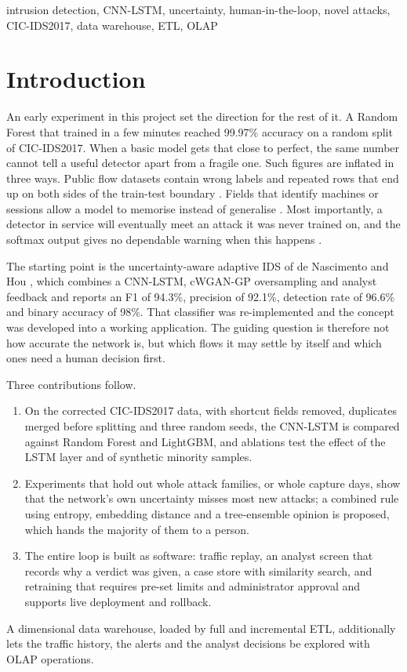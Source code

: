 \documentclass[conference]{IEEEtran}
\begin{document}
\begin{IEEEkeywords}
intrusion detection, CNN-LSTM, uncertainty, human-in-the-loop, novel attacks, CIC-IDS2017, data warehouse, ETL, OLAP
\end{IEEEkeywords}

\section{Introduction}
An early experiment in this project set the direction for the rest of it. A Random Forest that
trained in a few minutes reached 99.97\% accuracy on a random split of CIC-IDS2017. When a basic
model gets that close to perfect, the same number cannot tell a useful detector apart from a
fragile one. Such figures are inflated in three ways. Public flow datasets contain wrong labels and
repeated rows that end up on both sides of the train-test boundary
\cite{engelen2021troubleshooting,liu2022error}. Fields that identify machines or sessions allow a
model to memorise instead of generalise \cite{arp2022dos}. Most importantly, a detector in service
will eventually meet an attack it was never trained on, and the softmax output gives no dependable
warning when this happens \cite{sommer2010outside,hendrycks2017baseline}.

The starting point is the uncertainty-aware adaptive IDS of de Nascimento and Hou
\cite{refpaper2025}, which combines a CNN-LSTM, cWGAN-GP oversampling and analyst feedback and
reports an F1 of 94.3\%, precision of 92.1\%, detection rate of 96.6\% and binary accuracy of
98\%. That classifier was re-implemented and the concept was developed into a working application. The guiding
question is therefore not how accurate the network is, but which flows it may settle by itself and
which ones need a human decision first.

Three contributions follow.
\begin{enumerate}
\item On the corrected CIC-IDS2017 data, with shortcut fields removed, duplicates merged before
splitting and three random seeds, the CNN-LSTM is compared against Random Forest and LightGBM, and
ablations test the effect of the LSTM layer and of synthetic minority samples.
\item Experiments that hold out whole attack families, or whole capture days, show that the
network's own uncertainty misses most new attacks; a combined rule using entropy, embedding
distance and a tree-ensemble opinion is proposed, which hands the majority of them to a person.
\item The entire loop is built as software: traffic replay, an analyst screen that records why a
verdict was given, a case store with similarity search, and retraining that requires pre-set
limits and administrator approval and supports live deployment and rollback.
\end{enumerate}
A dimensional data warehouse, loaded by full and incremental ETL, additionally lets the traffic
history, the alerts and the analyst decisions be explored with OLAP operations.
\end{document}
